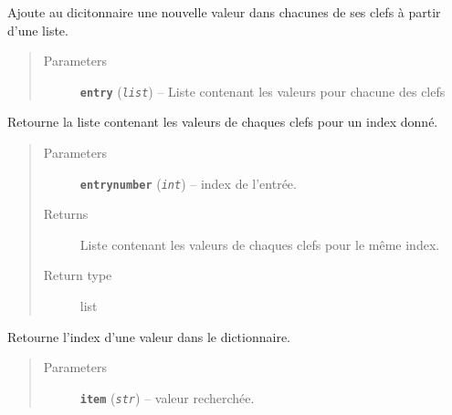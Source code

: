 \documentclass[letterpaper,10pt,english]{sphinxmanual}
\begin{document}
\begin{fulllineitems}
\begin{fulllineitems}
\begin{quote}
\begin{description}
\end{description}\end{quote}

\end{fulllineitems}


\begin{fulllineitems}
\label{loganalyser:loganalyser.outils.Dictionary.addentry}
Ajoute au dicitonnaire une nouvelle valeur dans chacunes de ses clefs à partir d'une liste.
\begin{quote}\begin{description}
\item[{Parameters}] \leavevmode
\textbf{\texttt{entry}} (\emph{\texttt{list}}) -- Liste contenant les valeurs pour chacune des clefs

\end{description}\end{quote}

\end{fulllineitems}


\begin{fulllineitems}
\label{loganalyser:loganalyser.outils.Dictionary.getentry}
Retourne la liste contenant les valeurs de chaques clefs pour un index donné.
\begin{quote}\begin{description}
\item[{Parameters}] \leavevmode
\textbf{\texttt{entrynumber}} (\emph{\texttt{int}}) -- index de l'entrée.

\item[{Returns}] \leavevmode
Liste contenant les valeurs de chaques clefs pour le même index.

\item[{Return type}] \leavevmode
list

\end{description}\end{quote}

\end{fulllineitems}


\begin{fulllineitems}
\label{loganalyser:loganalyser.outils.Dictionary.itemtoentrynumbers}
Retourne l'index d'une valeur dans le dictionnaire.
\begin{quote}\begin{description}
\item[{Parameters}] \leavevmode
\textbf{\texttt{item}} (\emph{\texttt{str}}) -- valeur recherchée.


\end{description}
\end{quote}
\end{fulllineitems}
\end{fulllineitems}
\end{document}
